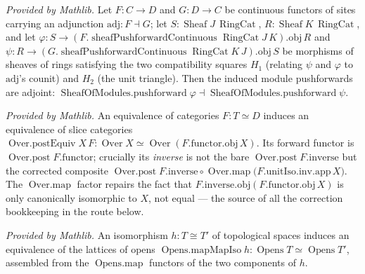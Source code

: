 \begin{lemma}
  \label{lem:pushforwardPushforwardAdj_mathlib}
  \mathlibok
  \textit{Provided by Mathlib.}
  Let \(F : C \to D\) and \(G : D \to C\) be continuous functors of sites carrying an adjunction
  \(\mathrm{adj} : F \dashv G\); let \(S : \operatorname{Sheaf} J\,\operatorname{RingCat}\), \(R :
  \operatorname{Sheaf} K\,\operatorname{RingCat}\), and let \(\varphi : S \to
  (F.\operatorname{sheafPushforwardContinuous} \operatorname{RingCat} J\,K).\mathrm{obj}\, R\) and
  \(\psi : R \to (G.\operatorname{sheafPushforwardContinuous} \operatorname{RingCat}
  K\,J).\mathrm{obj}\, S\) be morphisms of sheaves of rings satisfying the two compatibility squares
  \(H_1\) (relating \(\psi\) and \(\varphi\) to \(\mathrm{adj}\)'s counit) and \(H_2\) (the unit
  triangle). Then the induced module pushforwards are adjoint:
  \(\operatorname{SheafOfModules.pushforward}\varphi \dashv
  \operatorname{SheafOfModules.pushforward}\psi\).
\end{lemma}

\begin{lemma}
  \label{lem:over_postEquiv_mathlib}
  \mathlibok
  \textit{Provided by Mathlib.}
  An equivalence of categories \(F : T \simeq D\) induces an equivalence of slice categories
  \(\operatorname{Over.postEquiv} X\,F : \operatorname{Over} X \simeq \operatorname{Over}
  (F.\mathrm{functor}.\mathrm{obj}\, X)\). Its forward functor is \(\operatorname{Over.post}
  F.\mathrm{functor}\); crucially its \emph{inverse} is not the bare \(\operatorname{Over.post}
  F.\mathrm{inverse}\) but the corrected composite \(\operatorname{Over.post} F.\mathrm{inverse}
  \circ \operatorname{Over.map}\bigl(F.\mathrm{unitIso}.\mathrm{inv}.\mathrm{app}\, X\bigr)\). The
  \(\operatorname{Over.map}\) factor repairs the fact that \(F.\mathrm{inverse}.\mathrm{obj}
  (F.\mathrm{functor}.\mathrm{obj}\, X)\) is only canonically isomorphic to \(X\), not equal --- the
  source of all the correction bookkeeping in the route below.
\end{lemma}

\begin{lemma}
  \label{lem:opens_mapMapIso_mathlib}
  \mathlibok
  \textit{Provided by Mathlib.}
  An isomorphism \(h : T \cong T'\) of topological spaces induces an equivalence of the lattices of
  opens \(\operatorname{Opens.mapMapIso} h : \operatorname{Opens} T \simeq \operatorname{Opens} T'\),
  assembled from the \(\operatorname{Opens.map}\) functors of the two components of \(h\).
\end{lemma}


